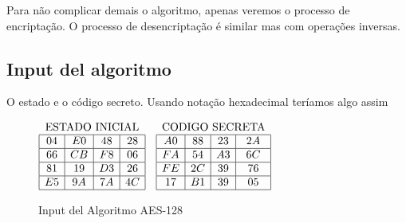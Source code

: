Para não complicar demais o algoritmo, apenas veremos o processo de encriptação. O processo de desencriptação é similar mas com operações inversas.
\subsection{Input del algoritmo}
O estado e o código secreto. Usando notação hexadecimal teríamos algo assim
\begin{figure}[!ht]
\begin{figurebox}
\begin{center}
$\begin{array}{|c|c|c|c|}
\multicolumn{4}{c}{\text{ESTADO INICIAL}}\\\hline
04 & E0 & 48 & 28\\\hline
66 & CB & F8 & 06\\\hline
81 & 19 & D3 & 26\\\hline
E5 & 9A & 7A & 4C\\\hline
\end{array}
\quad
\begin{array}{|c|c|c|c|}
\multicolumn{4}{c}{\text{CODIGO SECRETA}}\\\hline
A0 & 88 & 23 & 2A\\\hline
FA & 54 & A3 & 6C\\\hline
FE & 2C & 39 & 76\\\hline
17 & B1 & 39 & 05\\\hline
\end{array}
$
\end{center}\caption{Input del Algoritmo AES-128}\label{fig:inputaes1}
\end{figurebox}
\end{figure}
